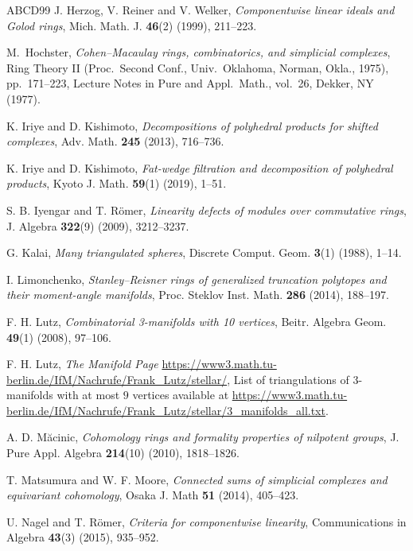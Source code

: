 \documentclass[a4paper,10pt]{amsart}
\theoremstyle{definition}
\theoremstyle{remark}
\begin{document}
\begin{thebibliography}{ABCD99}
 J. Herzog, V. Reiner and V. Welker, \emph{Componentwise linear ideals and Golod rings}, Mich. Math. J. \textbf{46}(2) (1999), 211--223.

 M.\ Hochster, \emph{Cohen--Macaulay rings, combinatorics, and simplicial complexes}, Ring Theory II (Proc.\ Second Conf., Univ.\ Oklahoma, Norman, Okla., 1975), pp.\ 171--223, Lecture Notes in Pure and Appl.\ Math., vol.\ 26, Dekker, NY (1977).

 K. Iriye and D. Kishimoto, \emph{Decompositions of polyhedral products for shifted complexes}, Adv. Math. \textbf{245} (2013), 716--736.

 K. Iriye and D. Kishimoto, \emph{Fat-wedge filtration and decomposition of polyhedral products}, Kyoto J. Math. \textbf{59}(1) (2019), 1--51.

 S. B. Iyengar and T. R\"omer, \emph{Linearity defects of modules over commutative rings}, J. Algebra \textbf{322}(9) (2009), 3212--3237.

 G. Kalai, \emph{Many triangulated spheres}, Discrete Comput. Geom. \textbf{3}(1) (1988), 1--14.

 I. Limonchenko, \emph{Stanley--Reisner rings of generalized truncation polytopes and their moment-angle manifolds}, Proc. Steklov Inst. Math. \textbf{286} (2014), 188--197.

 F. H. Lutz, \emph{Combinatorial 3-manifolds with 10 vertices}, Beitr. Algebra Geom. \textbf{49}(1) (2008), 97--106.

F. H. Lutz, \emph{The Manifold Page} \url{https://www3.math.tu-berlin.de/IfM/Nachrufe/Frank_Lutz/stellar/}, List of triangulations of $3$-manifolds with at most $9$ vertices available at \url{https://www3.math.tu-berlin.de/IfM/Nachrufe/Frank_Lutz/stellar/3_manifolds_all.txt}.

 A. D. M\u acinic, \emph{Cohomology rings and formality properties of nilpotent groups}, J. Pure Appl. Algebra \textbf{214}(10) (2010), 1818--1826.

 T. Matsumura and W. F. Moore, \emph{Connected sums of simplicial complexes and equivariant cohomology}, Osaka J. Math \textbf{51} (2014), 405--423.

 U. Nagel and T. R\"{o}mer, \emph{Criteria for componentwise linearity}, Communications in Algebra \textbf{43}(3) (2015), 935--952.


\end{thebibliography}
\end{document}

